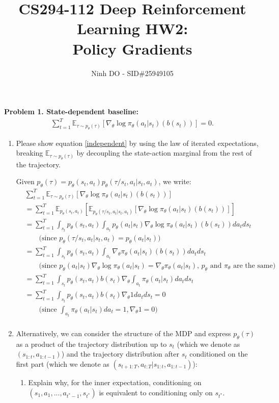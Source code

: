 \documentclass[12pt]{article}
\title{CS294-112 Deep Reinforcement Learning HW2: \\ Policy Gradients}
\author{
Ninh DO - SID\#25949105
}
\date{}
\begin{document}
\maketitle

\textbf{Problem 1. State-dependent baseline:}
%
\begin{align} \label{independent}
\sum_{t=1}^T \mathbb{E}_{\tau \sim p_\theta(\tau)}\left[ \nabla_\theta \log \pi_\theta(a_t|s_t) \left(b(s_t)\right)\right] = 0.
\end{align}
%
\begin{enumerate} [label=(\alph*)]
\item Please show equation \ref{independent} by using the law of iterated expectations, breaking $\mathbb{E}_{\tau \sim p_\theta(\tau)}$ by decoupling the state-action marginal from the rest of the trajectory.

Given $p_\theta(\tau) = p_\theta(s_t, a_t)p_\theta(\tau / s_t, a_t | s_t, a_t)$, we write:
%
\begin{align*}
&\sum_{t=1}^T \mathbb{E}_{\tau \sim p_\theta(\tau)}\left[ \nabla_\theta \log \pi_\theta(a_t|s_t) \left(b(s_t)\right)\right] \\
&= \sum_{t=1}^T \mathbb{E}_{p_\theta(s_t, a_t)} \left[ \mathbb{E}_{p_\theta(\tau / s_t, a_t | s_t, a_t)} \left[  \nabla_\theta \log \pi_\theta(a_t|s_t) \left(b(s_t)\right) \right]  \right] \\
&= \sum_{t=1}^T \int_{s_t} p_\theta(s_t, a_t) \int_{a_t} p_\theta(a_t | s_t) \nabla_\theta \log \pi_\theta(a_t|s_t) \left(b(s_t)\right) da_t ds_t \\
&\qquad \text{(since $p_\theta(\tau / s_t, a_t | s_t, a_t)=p_\theta(a_t | s_t)$)} \\
&= \sum_{t=1}^T \int_{s_t} p_\theta(s_t, a_t) \int_{a_t} \nabla_\theta \pi_\theta(a_t|s_t) \left(b(s_t)\right) da_t ds_t \\
&\qquad \text{(since $p_\theta(a_t | s_t) \nabla_\theta \log \pi_\theta(a_t|s_t)=\nabla_\theta \pi_\theta(a_t|s_t)$, $p_\theta$ and $\pi_\theta$ are the same)} \\
&= \sum_{t=1}^T \int_{s_t} p_\theta(s_t, a_t) b(s_t) \nabla_\theta \int_{a_t} \pi_\theta(a_t|s_t) da_t ds_t \\
&= \sum_{t=1}^T \int_{s_t} p_\theta(s_t, a_t) b(s_t) \nabla_\theta 1 da_t ds_t = 0\\
&\qquad \text{(since $\int_{a_t} \pi_\theta(a_t|s_t) da_t=1, \nabla_\theta 1 = 0$)} \\
\end{align*}
%
\item Alternatively, we can consider the structure of the MDP and express $p_\theta(\tau)$ as a product of the trajectory distribution up to $s_t$ (which we denote as $(s_{1:t}, a_{1:t-1})$) and the trajectory distribution after $s_t$ conditioned on the first part (which we denote as $(s_{t+1:T}, a_{t:T} | s_{1:t}, a_{1:t-1})$):
\begin{enumerate}
\item Explain why, for the inner expectation, conditioning on $(s_1, a_1, ..., a_{t^*-1}, s_{t^*})$ is equivalent to conditioning only on $s_{t^*}$.


\end{enumerate}
\end{enumerate}
\end{document}
